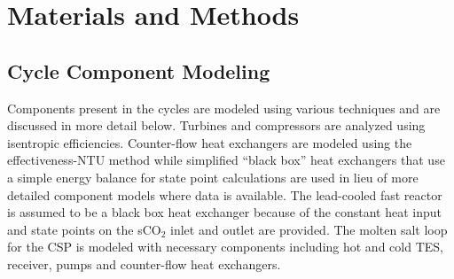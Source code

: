  
\section{Materials and Methods}






\subsection{Cycle Component Modeling}
Components present in the cycles are modeled using various techniques and are discussed in more detail below. Turbines and compressors are analyzed using isentropic efficiencies. Counter-flow heat exchangers are modeled using the effectiveness-NTU method while simplified ``black box'' heat exchangers that use a simple energy balance for state point calculations are used in lieu of more detailed component models where data is available. The lead-cooled fast reactor is assumed to be a black box heat exchanger because of the constant heat input and state points on the sCO$_2$ inlet and outlet are provided. The molten salt loop for the CSP is modeled with necessary components including hot and cold TES, receiver, pumps and counter-flow heat exchangers.



